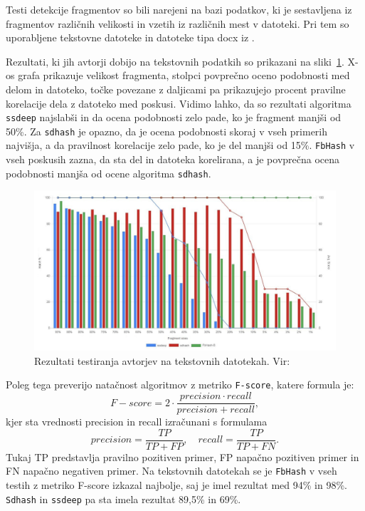 \documentclass{acm_proc_article-sp}
\begin{document}
Testi detekcije fragmentov so bili narejeni na bazi podatkov, ki je sestavljena iz fragmentov različnih velikosti in vzetih iz različnih mest v datoteki. Pri tem so uporabljene tekstovne datoteke in datoteke tipa docx iz \cite{zdataset}.

Rezultati, ki jih avtorji dobijo na tekstovnih podatkih so prikazani na sliki~\ref{fig:fd-rez}. X-os grafa prikazuje velikost fragmenta, stolpci povprečno oceno podobnosti med delom in datoteko, točke povezane z daljicami pa prikazujejo procent pravilne korelacije dela z datoteko med poskusi. Vidimo lahko, da so rezultati algoritma \texttt{ssdeep} najslabši in da ocena podobnosti zelo pade, ko je fragment manjši od 50\%. Za \texttt{sdhash} je opazno, da je ocena podobnosti skoraj v vseh primerih najvišja, a da pravilnost korelacije zelo pade, ko je del manjši od 15\%. \texttt{FbHash} v vseh poskusih zazna, da sta del in datoteka korelirana, a je povprečna ocena podobnosti manjša od ocene algoritma \texttt{sdhash}.  

\begin{figure}[htb]
\begin{center}
\includegraphics[width=1\columnwidth]{frag_det_text.png}
\end{center}
\caption{\small{Rezultati testiranja avtorjev na tekstovnih datotekah. Vir: \cite{fbhash}}}
\label{fig:fd-rez}
\end{figure}

Poleg tega preverijo natačnost algoritmov z metriko  \texttt{F-score}, katere formula je:
\begin{displaymath} F-score = 2\cdot\frac{precision\cdot recall}{precision + recall},\end{displaymath} 
kjer sta vrednosti precision in recall izračunani s formulama
\begin{displaymath} precision = \frac{TP}{TP + FP},\quad recall = \frac{TP}{TP+FN}.\end{displaymath} 
Tukaj TP predstavlja pravilno pozitiven primer, FP napačno pozitiven primer in FN napačno negativen primer. Na tekstovnih datotekah se je \texttt{FbHash} v vseh testih z metriko F-score izkazal najbolje, saj je imel rezultat med 94\% in 98\%. \texttt{Sdhash} in \texttt{ssdeep} pa sta imela rezultat 89,5\% in 69\%.
\end{document}
